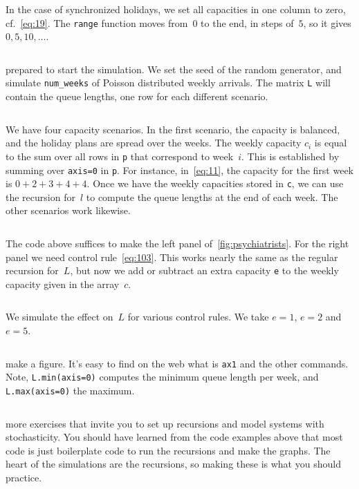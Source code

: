 \documentclass[queueing-book.tex]{subfiles}
\begin{document}
In the case of synchronized holidays, we set all capacities in one column to zero, cf.~\cref{eq:19}.
The \texttt{range} function moves from~$0$ to the end, in steps of~$5$, so it gives $0, 5, 10, \ldots$.
\inputminted[firstline=96, lastline=99]{python}{../code/psychiatrists.py} %


 prepared to start the simulation. We set the seed of the random generator, and simulate \texttt{num_weeks} of Poisson distributed weekly arrivals. The matrix \texttt{L} will contain the queue lengths, one row for each different scenario.

\inputminted[firstline=106, lastline=109]{python}{../code/psychiatrists.py} %

We have four capacity scenarios.
In the first scenario, the capacity is balanced, and the holiday plans are spread over the weeks.
The weekly capacity $c_{i}$ is equal to the sum over all rows in \texttt{p} that correspond to week~$i$. This is established by summing over \texttt{axis=0} in \texttt{p}.
For instance, in~\cref{eq:11}, the capacity for the first week is $0+2+3+4+4$.
Once we have the weekly capacities stored in \texttt{c}, we can use the recursion for~$l$ to compute the queue lengths at the end of each week.
The other scenarios work likewise.
\inputminted[firstline=113, lastline=131]{python}{../code/psychiatrists.py} %


The code above suffices to make the left panel of~\cref{fig:psychiatrists}. For the right panel we need  control rule~\cref{eq:103}. This works nearly the same as the regular recursion for~$L$, but now we add or subtract an extra capacity \texttt{e} to the weekly capacity given in the array~$c$.
\inputminted[firstline=41, lastline=50]{python}{../code/psychiatrists.py} %

We simulate the effect on~$L$ for various control rules. We take $e=1$, $e=2$ and $e=5$.
\inputminted[firstline=136, lastline=141]{python}{../code/psychiatrists.py} %

 make a figure.
It's easy to find on the web what is \texttt{ax1} and the other commands.
Note, \texttt{L.min(axis=0)} computes the minimum queue length per week, and \texttt{L.max(axis=0)} the maximum.
\inputminted[firstline=146, lastline=163]{python}{../code/psychiatrists.py} %

 more exercises that invite you to set up recursions and model systems with stochasticity.
You should have learned from the code examples above that most code is just boilerplate code to run the recursions and make the graphs.
The heart of the simulations are the recursions, so making these is what you should practice.
\end{document}
